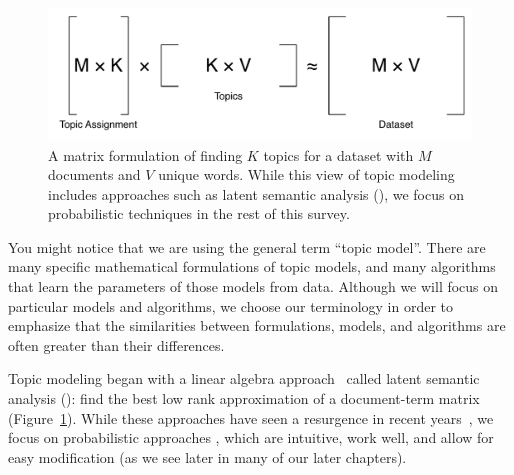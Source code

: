 \begin{center}
\begin{figure}
  \begin{center}
  \includegraphics[width=.8\linewidth]{figures/matrix_factorization}
  \end{center}

  \caption{A matrix formulation of finding $K$ topics for a dataset
    with $M$ documents and $V$ unique words.  While this
    view of topic modeling includes approaches such as latent semantic
    analysis (), we focus on probabilistic techniques in the
    rest of this survey.}
  \label{fig:matrix_topics}
\end{figure}
\end{center}

You might notice that we are using the general term ``topic model''.
There are many specific mathematical formulations of topic models, and many algorithms that learn the parameters of those models from data.
Although we will focus on particular models and algorithms, we choose our terminology in order to emphasize that the similarities between formulations, models, and algorithms are often greater than their differences.

Topic modeling began with a linear algebra approach~\citep{deerwester-90} called
latent semantic analysis (): find the best low rank approximation of a
document-term matrix (Figure~\ref{fig:matrix_topics}).  While these approaches
have seen a resurgence in recent years~\citep{anandkumar-12:lda,arora-13}, we
focus on probabilistic approaches \cite{hofmann-99,papadimitriou-00,blei-03}, which are intuitive, work well, and allow for
easy modification (as we see later in many of our later chapters).

